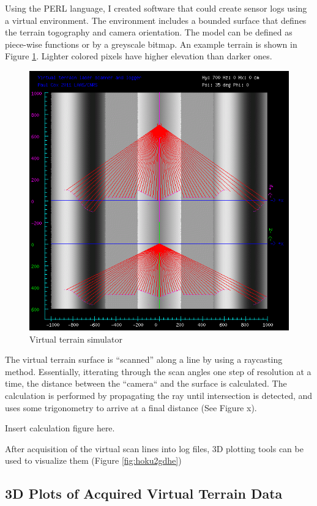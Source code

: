 \documentclass[a4paper,11pt]{report}
\begin{document}
Using the PERL language, I created software that could create sensor logs using a virtual environment. The environment includes a bounded surface that defines the terrain togography and camera orientation. The model can be defined as piece-wise functions or by a greyscale bitmap. An example terrain is shown in Figure \ref{fig:mkvirt}. Lighter colored pixels have higher elevation than darker ones.

\begin{figure}[ht]
 \centering
 \includegraphics[width=12cm]{./Mkvirtsample.png}
 \caption{Virtual terrain simulator}
 \label{fig:mkvirt}
\end{figure}

The virtual terrain surface is ``scanned'' along a line by using a raycasting method. Essentially, itterating through the scan angles one step of resolution at a time, the distance between the ``camera`` and the surface is calculated. The calculation is performed by propagating the ray until intersection is detected, and uses some trigonometry to arrive at a final distance (See Figure x).

Insert calculation figure here.

After acquisition of the virtual scan lines into log files, 3D plotting tools can be used to visualize them (Figure \ref{fig:hoku2gdhe})

\subsection{3D Plots of Acquired Virtual Terrain Data}
\end{document}
